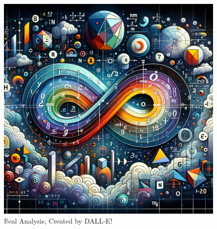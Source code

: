 \documentclass[10pt]{book}
\begin{document}

\begin{figure}[h!]
	\centering
	\includegraphics[width=1\linewidth]{Images/realAnalysis}
	\caption*{$\mathbb{R}$eal Analysis, Created by DALL-E!}
	\label{fig:realanalysis}
	
\end{figure}




\tableofcontents


\newpage

\newpage

\newpage

\end{document}
